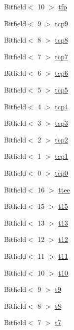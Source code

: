 \begin{DoxyCompactItemize}
\item 
Bitfield$<$ 10 $>$ \hyperlink{namespaceArmISA_adb386d68daa1dba6ffd511fc9b5731b3}{tfp}
\item 
Bitfield$<$ 9 $>$ \hyperlink{namespaceArmISA_a6c46916e48d136aa44a04ec86d7e2588}{tcp9}
\item 
Bitfield$<$ 8 $>$ \hyperlink{namespaceArmISA_a1a35a0370462e2ccf9631eab12b3f2b7}{tcp8}
\item 
Bitfield$<$ 7 $>$ \hyperlink{namespaceArmISA_a0f61be58b73415b5a46fe266b2dea07a}{tcp7}
\item 
Bitfield$<$ 6 $>$ \hyperlink{namespaceArmISA_aa8ab39fcb1dbc8251dd544353e974344}{tcp6}
\item 
Bitfield$<$ 5 $>$ \hyperlink{namespaceArmISA_a5a23d0276c31549ae91532709495f160}{tcp5}
\item 
Bitfield$<$ 4 $>$ \hyperlink{namespaceArmISA_a485e4ca4abd58493589cac62cd1a302a}{tcp4}
\item 
Bitfield$<$ 3 $>$ \hyperlink{namespaceArmISA_a01b7313be4d228cffcd2e2306300534d}{tcp3}
\item 
Bitfield$<$ 2 $>$ \hyperlink{namespaceArmISA_a568207b0d8788bd7c6c2eeeb27fcd41c}{tcp2}
\item 
Bitfield$<$ 1 $>$ \hyperlink{namespaceArmISA_a3bcee15239b0e4094ca1ffca4cf590e0}{tcp1}
\item 
Bitfield$<$ 0 $>$ \hyperlink{namespaceArmISA_aac6d7a6864b859bba8f723eae133ec27}{tcp0}
\item 
Bitfield$<$ 16 $>$ \hyperlink{namespaceArmISA_a053754a7c7a2f7c64a8b377ffbf1006a}{ttee}
\item 
Bitfield$<$ 15 $>$ \hyperlink{namespaceArmISA_a1a7d402581377a3fca5d7df48cf250a9}{t15}
\item 
Bitfield$<$ 13 $>$ \hyperlink{namespaceArmISA_a101be5f0f1f2b401e05424d2049a4d08}{t13}
\item 
Bitfield$<$ 12 $>$ \hyperlink{namespaceArmISA_a640d13afd89c3b83c5ccdb592bf3ef9a}{t12}
\item 
Bitfield$<$ 11 $>$ \hyperlink{namespaceArmISA_a00e29a491f33703b24ca885ebde8ce91}{t11}
\item 
Bitfield$<$ 10 $>$ \hyperlink{namespaceArmISA_a002410d9e603c9131cc018f3c86da155}{t10}
\item 
Bitfield$<$ 9 $>$ \hyperlink{namespaceArmISA_a55178525601e288e5d1a5a73d8d80358}{t9}
\item 
Bitfield$<$ 8 $>$ \hyperlink{namespaceArmISA_a81909a16080109bd56d145223540f617}{t8}
\item 
Bitfield$<$ 7 $>$ \hyperlink{namespaceArmISA_a376e26a00e216ed6c110853fcdeca49d}{t7}

\end{DoxyCompactItemize}
